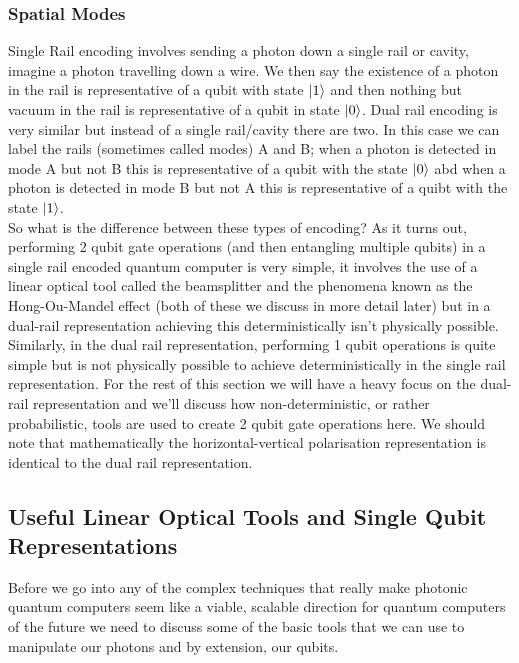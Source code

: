 \subsubsection{Spatial Modes}
Single Rail encoding involves sending a photon down a single rail or cavity, imagine a photon travelling down a wire. We then say the existence of a photon in the rail is representative of a qubit with state $\ket{1}$ and then nothing but vacuum in the rail is representative of a qubit in state $\ket{0}$. Dual rail encoding is very similar but instead of a single rail/cavity there are two. In this case we can label the rails (sometimes called modes) A and B; when a photon is detected in mode A but not B this is representative of a qubit with the state $\ket{0}$ abd when a photon is detected in mode B but not A this is representative of a quibt with the state $\ket{1}$. \\ So what is the difference between these types of encoding? As it turns out, performing 2 qubit gate operations (and then entangling multiple qubits) in a single rail encoded quantum computer is very simple, it involves the use of a linear optical tool called the beamsplitter and the phenomena known as the Hong-Ou-Mandel effect (both of these we discuss in more detail later) but in a dual-rail representation achieving this deterministically isn't physically possible. Similarly, in the dual rail representation, performing 1 qubit operations is quite simple but is not physically possible to achieve deterministically in the single rail representation. For the rest of this section we will have a heavy focus on the dual-rail representation and we'll discuss how non-deterministic, or rather probabilistic, tools are used to create 2 qubit gate operations here. We should note that mathematically the horizontal-vertical polarisation representation is identical to the dual rail representation. 



\subsection{Useful Linear Optical Tools and Single Qubit Representations}
Before we go into any of the complex techniques that really make photonic quantum computers seem like a viable, scalable direction for quantum computers of the future we need to discuss some of the basic tools that we can use to manipulate our photons and by extension, our qubits.
